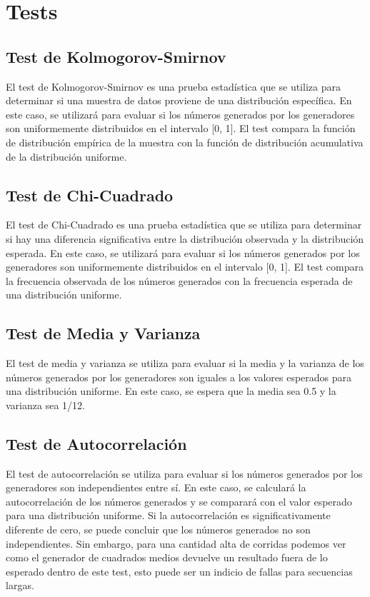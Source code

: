 \documentclass{article}
\begin{document}
\section{Tests}
\subsection{Test de Kolmogorov-Smirnov}
El test de Kolmogorov-Smirnov es una prueba estadística que se utiliza para determinar si una muestra de datos proviene de una distribución específica. En este caso, se utilizará para evaluar si los números generados por los generadores son uniformemente distribuidos en el intervalo [0, 1]. El test compara la función de distribución empírica de la muestra con la función de distribución acumulativa de la distribución uniforme.
\subsection{Test de Chi-Cuadrado}
El test de Chi-Cuadrado es una prueba estadística que se utiliza para determinar si hay una diferencia significativa entre la distribución observada y la distribución esperada. En este caso, se utilizará para evaluar si los números generados por los generadores son uniformemente distribuidos en el intervalo [0, 1]. El test compara la frecuencia observada de los números generados con la frecuencia esperada de una distribución uniforme.
\subsection{Test de Media y Varianza}
El test de media y varianza se utiliza para evaluar si la media y la varianza de los números generados por los generadores son iguales a los valores esperados para una distribución uniforme. En este caso, se espera que la media sea 0.5 y la varianza sea 1/12.
\subsection{Test de Autocorrelación}
El test de autocorrelación se utiliza para evaluar si los números generados por los generadores son independientes entre sí. En este caso, se calculará la autocorrelación de los números generados y se comparará con el valor esperado para una distribución uniforme. Si la autocorrelación es significativamente diferente de cero, se puede concluir que los números generados no son independientes. Sin embargo, para una cantidad alta de corridas podemos ver como el generador de cuadrados medios devuelve un resultado fuera de lo esperado dentro de este test, esto puede ser un indicio de fallas para secuencias largas. 
\end{document}
